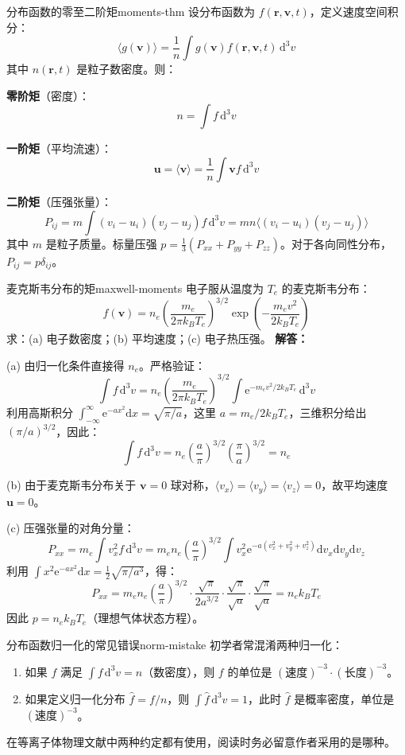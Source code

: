 \documentclass[12pt,a4paper,openany,oneside]{book}
\newcommand{\diff}{\mathrm{d}}
\newcommand{\ee}{\mathrm{e}}
\newcommand{\vect}[1]{\bm{#1}}
\newcommand{\difficulty}[1]{\marginnote{\textcolor{red}{\textbf{[#1]}}}}
\begin{document}
\begin{theorem}{分布函数的零至二阶矩}{moments-thm}
设分布函数为 $f(\vect{r},\vect{v},t)$，定义速度空间积分：
\[
\langle g(\vect{v}) \rangle = \frac{1}{n}\int g(\vect{v}) f(\vect{r},\vect{v},t)\,\diff^3v
\]
其中 $n(\vect{r},t)$ 是粒子数密度。则：

\textbf{零阶矩}（密度）：
\[
n = \int f\,\diff^3v
\]

\textbf{一阶矩}（平均流速）：
\[
\vect{u} = \langle \vect{v} \rangle = \frac{1}{n}\int \vect{v} f\,\diff^3v
\]

\textbf{二阶矩}（压强张量）：
\[
P_{ij} = m \int (v_i - u_i)(v_j - u_j) f\,\diff^3v = mn \langle (v_i-u_i)(v_j-u_j) \rangle
\]
其中 $m$ 是粒子质量。标量压强 $p = \frac{1}{3}(P_{xx}+P_{yy}+P_{zz})$。对于各向同性分布，$P_{ij} = p\delta_{ij}$。
\end{theorem}

\begin{example}{麦克斯韦分布的矩}{maxwell-moments}
\difficulty{基础}
电子服从温度为 $T_e$ 的麦克斯韦分布：
\[
f(\vect{v}) = n_e \left(\frac{m_e}{2\pi k_B T_e}\right)^{3/2} \exp\left(-\frac{m_e v^2}{2k_B T_e}\right)
\]
求：(a) 电子数密度；(b) 平均速度；(c) 电子热压强。
\tcblower
\textbf{解答：}

(a) 由归一化条件直接得 $n_e$。严格验证：
\[
\int f\,\diff^3v = n_e \left(\frac{m_e}{2\pi k_B T_e}\right)^{3/2} \int \ee^{-m_e v^2/2k_B T_e}\,\diff^3v
\]
利用高斯积分 $\int_{-\infty}^{\infty} \ee^{-ax^2}\diff x = \sqrt{\pi/a}$，这里 $a = m_e/2k_B T_e$，三维积分给出 $(\pi/a)^{3/2}$，因此：
\[
\int f\,\diff^3v = n_e \left(\frac{a}{\pi}\right)^{3/2} \left(\frac{\pi}{a}\right)^{3/2} = n_e
\]

(b) 由于麦克斯韦分布关于 $\vect{v}=0$ 球对称，$\langle v_x \rangle = \langle v_y \rangle = \langle v_z \rangle = 0$，故平均速度 $\vect{u}=0$。

(c) 压强张量的对角分量：
\[
P_{xx} = m_e \int v_x^2 f\,\diff^3v = m_e n_e \left(\frac{a}{\pi}\right)^{3/2} \int v_x^2 \ee^{-a(v_x^2+v_y^2+v_z^2)}\diff v_x\diff v_y\diff v_z
\]
利用 $\int x^2 \ee^{-ax^2}\diff x = \frac{1}{2}\sqrt{\pi/a^3}$，得：
\[
P_{xx} = m_e n_e \left(\frac{a}{\pi}\right)^{3/2} \cdot \frac{\sqrt{\pi}}{2a^{3/2}} \cdot \frac{\sqrt{\pi}}{\sqrt{a}} \cdot \frac{\sqrt{\pi}}{\sqrt{a}} = n_e k_B T_e
\]
因此 $p = n_e k_B T_e$（理想气体状态方程）。
\end{example}

\begin{warning}{分布函数归一化的常见错误}{norm-mistake}
初学者常混淆两种归一化：
\begin{enumerate}
\item 如果 $f$ 满足 $\int f\,\diff^3v = n$（数密度），则 $f$ 的单位是 $(\text{速度})^{-3}\cdot(\text{长度})^{-3}$。
\item 如果定义归一化分布 $\hat{f} = f/n$，则 $\int \hat{f}\,\diff^3v = 1$，此时 $\hat{f}$ 是概率密度，单位是 $(\text{速度})^{-3}$。
\end{enumerate}
在等离子体物理文献中两种约定都有使用，阅读时务必留意作者采用的是哪种。
\end{warning}
\end{document}
